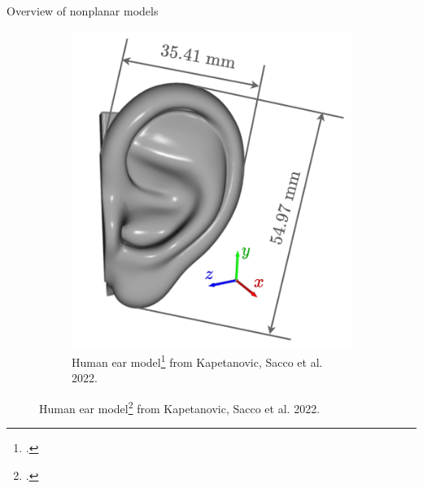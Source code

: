 \documentclass[xcolor=dvipsnames,10pt]{beamer}
\begin{document}
\begin{frame}{Overview of nonplanar models}
\begin{figure}
\begin{subfigure}[b]{0.31\textwidth}
         \includegraphics[width=\textwidth]{artwork/Kapetanovic2022Figure1_adjusted.pdf}
         \caption{Human ear model\footcite{Kapetanovic2023Area-averaged} from Kapetanovic, Sacco et al. 2022.}
     \end{subfigure}
    \end{figure}
\end{frame}
\end{document}
